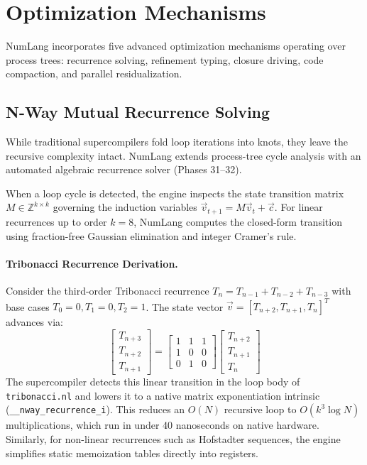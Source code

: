 \section{Optimization Mechanisms}
\label{sec:optimization}

NumLang incorporates five advanced optimization mechanisms operating over process trees: recurrence solving, refinement typing, closure driving, code compaction, and parallel residualization.

\subsection{N-Way Mutual Recurrence Solving}
\label{sec:opt:recurrence}
While traditional supercompilers fold loop iterations into knots, they leave the recursive complexity intact. NumLang extends process-tree cycle analysis with an automated algebraic recurrence solver (Phases 31--32).

When a loop cycle is detected, the engine inspects the state transition matrix $M \in \mathbb{Z}^{k \times k}$ governing the induction variables $\vec{v}_{t+1} = M \vec{v}_t + \vec{c}$. For linear recurrences up to order $k=8$, NumLang computes the closed-form transition using fraction-free Gaussian elimination and integer Cramer's rule.

\paragraph{Tribonacci Recurrence Derivation.}
Consider the third-order Tribonacci recurrence $T_n = T_{n-1} + T_{n-2} + T_{n-3}$ with base cases $T_0=0, T_1=0, T_2=1$. The state vector $\vec{v} = [T_{n+2}, T_{n+1}, T_n]^T$ advances via:
\begin{equation}
\begin{bmatrix}
T_{n+3} \\ T_{n+2} \\ T_{n+1}
\end{bmatrix}
=
\begin{bmatrix}
1 & 1 & 1 \\
1 & 0 & 0 \\
0 & 1 & 0
\end{bmatrix}
\begin{bmatrix}
T_{n+2} \\ T_{n+1} \\ T_n
\end{bmatrix}
\end{equation}
The supercompiler detects this linear transition in the loop body of \texttt{tribonacci.nl} and lowers it to a native matrix exponentiation intrinsic (\texttt{\_\_nway\_recurrence\_i}). This reduces an $O(N)$ recursive loop to $O(k^3 \log N)$ multiplications, which run in under 40 nanoseconds on native hardware. Similarly, for non-linear recurrences such as Hofstadter sequences, the engine simplifies static memoization tables directly into registers.

